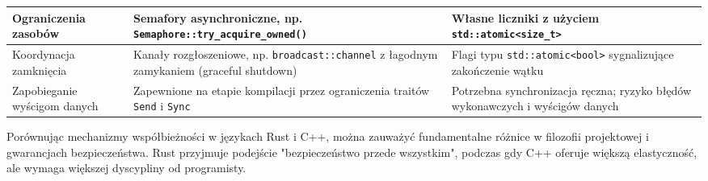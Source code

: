 \begin{table}[H]
\begin{tabularx}{\textwidth}{l>{\raggedright\arraybackslash}X>{\raggedright\arraybackslash}X}
        \midrule
        Ograniczenia zasobów &
        Semafory asynchroniczne, np. \texttt{Semaphore::try\_acquire\_owned()} &
        Własne liczniki z użyciem \texttt{std::atomic<size\_t>} \\
        \midrule
        Koordynacja zamknięcia &
        Kanały rozgłoszeniowe, np. \texttt{broadcast::channel} z łagodnym zamykaniem (graceful shutdown) &
        Flagi typu \texttt{std::atomic<bool>} sygnalizujące zakończenie wątku \\
        \midrule
        Zapobieganie wyścigom danych &
        Zapewnione na etapie kompilacji przez ograniczenia traitów \texttt{Send} i \texttt{Sync} &
        Potrzebna synchronizacja ręczna; ryzyko błędów wykonawczych i wyścigów danych \\
        \bottomrule
    \end{tabularx}
\end{table}


Porównując mechanizmy współbieżności w językach Rust i C++, można zauważyć fundamentalne różnice w filozofii projektowej i gwarancjach bezpieczeństwa. Rust przyjmuje podejście "bezpieczeństwo przede wszystkim", podczas gdy C++ oferuje większą elastyczność, ale wymaga większej dyscypliny od programisty.

